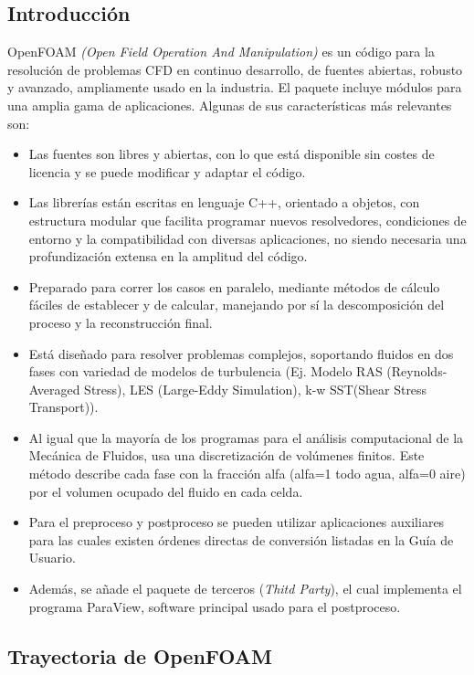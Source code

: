 \subsection{Introducción}\label{header-n2}

OpenFOAM \emph{(Open Field Operation And Manipulation)} es un código
para la resolución de problemas CFD en continuo desarrollo, de fuentes
abiertas, robusto y avanzado, ampliamente usado en la industria. El
paquete incluye módulos para una amplia gama de aplicaciones. Algunas de
sus características más relevantes son:

\begin{itemize}
\item
  Las fuentes son libres y abiertas, con lo que está disponible sin
  costes de licencia y se puede modificar y adaptar el código.
\item
  Las librerías están escritas en lenguaje C++, orientado a objetos, con
  estructura modular que facilita programar nuevos resolvedores,
  condiciones de entorno y la compatibilidad con diversas aplicaciones,
  no siendo necesaria una profundización extensa en la amplitud del
  código.
\item
  Preparado para correr los casos en paralelo, mediante métodos de
  cálculo fáciles de establecer y de calcular, manejando por sí la
  descomposición del proceso y la reconstrucción final.
\item
  Está diseñado para resolver problemas complejos, soportando fluidos en
  dos fases con variedad de modelos de turbulencia (Ej. Modelo RAS
  (Reynolds-Averaged Stress), LES (Large-Eddy Simulation), k-w SST(Shear
  Stress Transport)).
\item
  Al igual que la mayoría de los programas para el análisis
  computacional de la Mecánica de Fluidos, usa una discretización de
  volúmenes finitos. Este método describe cada fase con la fracción alfa
  (alfa=1 todo agua, alfa=0 aire) por el volumen ocupado del fluido en
  cada celda.
\item
  Para el preproceso y postproceso se pueden utilizar aplicaciones
  auxiliares para las cuales existen órdenes directas de conversión
  listadas en la Guía de Usuario.
\item
  Además, se añade el paquete de terceros (\emph{Thitd Party}), el cual
  implementa el programa ParaView, software principal usado para el
  postproceso.
\end{itemize}

\subsection{Trayectoria de OpenFOAM}\label{header-n28}

